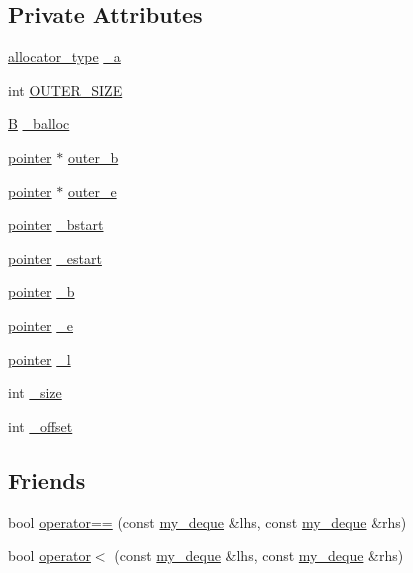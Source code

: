 \subsection*{Private Attributes}
\begin{DoxyCompactItemize}
\item 
\hyperlink{classmy__deque_a34236f0fef930decd11dc683f40a38be}{allocator\-\_\-type} \hyperlink{classmy__deque_ab2ba2e14114a27b2f91e47dfccabc639}{\-\_\-a}
\item 
int \hyperlink{classmy__deque_a27647dca34c708d1b4705ede6d46fd7e}{O\-U\-T\-E\-R\-\_\-\-S\-I\-Z\-E}
\item 
\hyperlink{classmy__deque_a1a55c016646bba79086d90d3cccde143}{B} \hyperlink{classmy__deque_aff09be5225ab5c67ce40d4876a3afbe7}{\-\_\-balloc}
\item 
\hyperlink{classmy__deque_a58e82fc365a3b086367479515e1515be}{pointer} $\ast$ \hyperlink{classmy__deque_afe69687aa94aa63dbb23e147a90db3d1}{outer\-\_\-b}
\item 
\hyperlink{classmy__deque_a58e82fc365a3b086367479515e1515be}{pointer} $\ast$ \hyperlink{classmy__deque_a4d7496e28dd1a7bda7df4c6861b1f5c1}{outer\-\_\-e}
\item 
\hyperlink{classmy__deque_a58e82fc365a3b086367479515e1515be}{pointer} \hyperlink{classmy__deque_abb765edbf3d947df440a760c5e1eb810}{\-\_\-bstart}
\item 
\hyperlink{classmy__deque_a58e82fc365a3b086367479515e1515be}{pointer} \hyperlink{classmy__deque_ae0e648a3abb9594093b50eaaf09d1e0d}{\-\_\-estart}
\item 
\hyperlink{classmy__deque_a58e82fc365a3b086367479515e1515be}{pointer} \hyperlink{classmy__deque_aaa73de3a597f551851ec4a79c7100dac}{\-\_\-b}
\item 
\hyperlink{classmy__deque_a58e82fc365a3b086367479515e1515be}{pointer} \hyperlink{classmy__deque_aa9adebd4257de224e119b91ef209abca}{\-\_\-e}
\item 
\hyperlink{classmy__deque_a58e82fc365a3b086367479515e1515be}{pointer} \hyperlink{classmy__deque_a3d540bafe793c6ae6ceee0bd78d59a9c}{\-\_\-l}
\item 
int \hyperlink{classmy__deque_a9d27e92833c2e24410dae3b329ebc5da}{\-\_\-size}
\item 
int \hyperlink{classmy__deque_a8f70b94005db4d4780bfd0947568c730}{\-\_\-offset}
\end{DoxyCompactItemize}
\subsection*{Friends}
\begin{DoxyCompactItemize}
\item 
bool \hyperlink{classmy__deque_aca1e37552707f9d7710a6af82cf1262e}{operator==} (const \hyperlink{classmy__deque}{my\-\_\-deque} \&lhs, const \hyperlink{classmy__deque}{my\-\_\-deque} \&rhs)
\item 
bool \hyperlink{classmy__deque_abd32df1d76a0ab0c1519f65cc4fa1363}{operator$<$} (const \hyperlink{classmy__deque}{my\-\_\-deque} \&lhs, const \hyperlink{classmy__deque}{my\-\_\-deque} \&rhs)
\end{DoxyCompactItemize}


